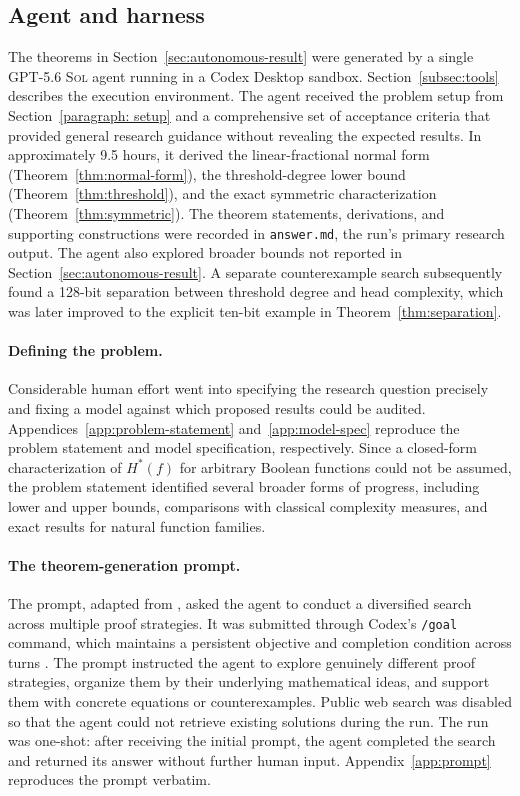 \documentclass{article}
\theoremstyle{definition}
\theoremstyle{plain}
\newcommand{\hstar}{H^{\ast}}
\newcommand{\gpt}{\textsc{GPT-5.6 Sol}\xspace}
\begin{document}
\subsection{Agent and harness}


The theorems in Section~\ref{sec:autonomous-result} were generated by a single \gpt agent running in a Codex Desktop sandbox. Section~\ref{subsec:tools} describes the execution environment. The agent received the problem setup from Section~\ref{paragraph: setup} and a comprehensive set of acceptance criteria that provided general research guidance without revealing the expected results. In approximately 9.5 hours, it derived the linear-fractional normal form (Theorem~\ref{thm:normal-form}), the threshold-degree lower bound (Theorem~\ref{thm:threshold}), and the exact symmetric characterization (Theorem~\ref{thm:symmetric}). The theorem statements, derivations, and supporting constructions were recorded in \texttt{answer.md}, the run's primary research output. The agent also explored broader bounds not reported in Section~\ref{sec:autonomous-result}. A separate counterexample search subsequently found a 128-bit separation between threshold degree and head complexity, which was later improved to the explicit ten-bit example in Theorem~\ref{thm:separation}.

\paragraph{Defining the problem.}
Considerable human effort went into specifying the research question precisely and fixing a model against which proposed results could be audited. Appendices~\ref{app:problem-statement} and~\ref{app:model-spec} reproduce the problem statement and model specification, respectively. Since a closed-form characterization of $\hstar(f)$ for arbitrary Boolean functions could not be assumed, the problem statement identified several broader forms of progress, including lower and upper bounds, comparisons with classical complexity measures, and exact results for natural function families.

\paragraph{The theorem-generation prompt.}
The prompt, adapted from \citet{openai2026cdcprompt}, asked the agent to conduct a diversified search across multiple proof strategies. It was submitted through Codex's \texttt{/goal} command, which maintains a persistent objective and completion condition across turns \citep{pathak2026goals}. The prompt instructed the agent to explore genuinely different proof strategies, organize them by their underlying mathematical ideas, and support them with concrete equations or counterexamples. Public web search was disabled so that the agent could not retrieve existing solutions during the run. The run was one-shot: after receiving the initial prompt, the agent completed the search and returned its answer without further human input. Appendix~\ref{app:prompt} reproduces the prompt verbatim.
\end{document}
